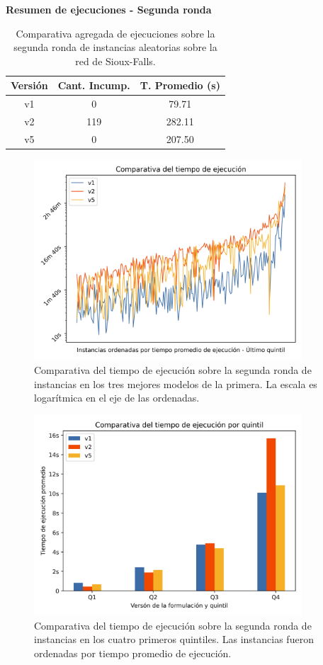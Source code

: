 \documentclass{article}
\begin{document}
  \begin{table}[h!]
    \centering
    \caption*{{\bf Resumen de ejecuciones - Segunda ronda}}
    \begin{tabular}{ccc}
      \toprule
      Versión & Cant. Incump. & T. Promedio (s) \\
      \midrule
      v1 & 0   & 79.71   \\
      v2 & 119 & 282.11  \\
      v5 & 0   & 207.50  \\
      \bottomrule
    \end{tabular}
    \caption{Comparativa agregada de ejecuciones sobre la segunda ronda de instancias aleatorias sobre la red de Sioux-Falls.}\label{table:resumenreejecuciones}
  \end{table}

  \begin{figure}[h!]
    \centering
    \includegraphics[width=10cm]{../resources/run_time_comparsion_rerun.png}
    \caption{Comparativa del tiempo de ejecución sobre la segunda ronda de instancias en los tres mejores modelos de la primera. La escala es logarítmica en el eje de las ordenadas.} \label{fig:runtimecomparisonrerun}
  \end{figure}

  \begin{figure}[h!]
    \centering
    \includegraphics[width=10cm]{../resources/run_time_comparsion_by_quintile_rerun.png}
    \caption{Comparativa del tiempo de ejecución sobre la segunda ronda de instancias en los cuatro primeros quintiles. Las instancias fueron ordenadas por tiempo promedio de ejecución.} \label{fig:firstfourquintilesrerun}
  \end{figure}
\end{document}
